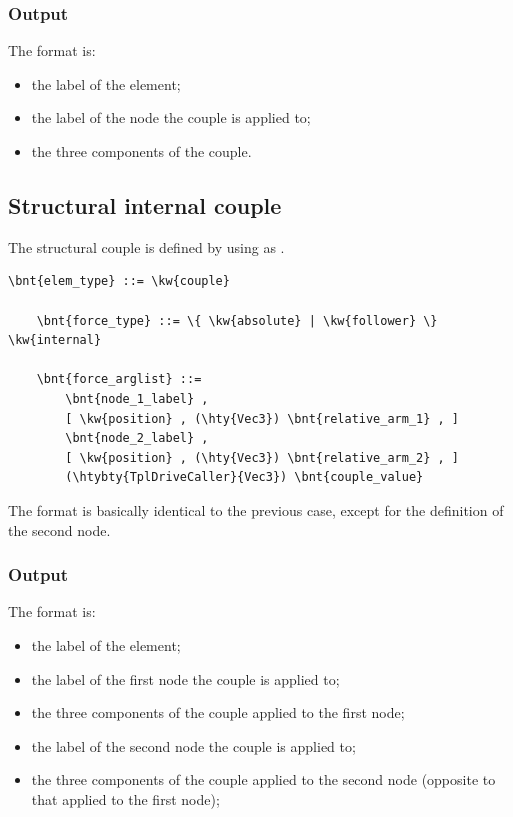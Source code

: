 \subsubsection{Output}
The format is:
\begin{itemize}
    \item the label of the element;
    \item the label of the node the couple is applied to;
    \item the three components of the couple.
\end{itemize}

\subsection{Structural internal couple}
\label{sec:EL:FORCE:STRUCTURAL:INTERNAL_COUPLE}
The structural couple is defined by using  as .
\begin{Verbatim}[commandchars=\\\{\}]
    \bnt{elem_type} ::= \kw{couple}

    \bnt{force_type} ::= \{ \kw{absolute} | \kw{follower} \} \kw{internal}

    \bnt{force_arglist} ::=
        \bnt{node_1_label} ,
        [ \kw{position} , (\hty{Vec3}) \bnt{relative_arm_1} , ]
        \bnt{node_2_label} ,
        [ \kw{position} , (\hty{Vec3}) \bnt{relative_arm_2} , ]
        (\htybty{TplDriveCaller}{Vec3}) \bnt{couple_value}
\end{Verbatim}
The format is basically identical to the previous case,
except for the definition of the second node.

\subsubsection{Output}
The format is:
\begin{itemize}
    \item the label of the element;
    \item the label of the first node the couple is applied to;
    \item the three components of the couple applied to the first node;
    \item the label of the second node the couple is applied to;
    \item the three components of the couple applied to the second node
	  (opposite to that applied to the first node);
\end{itemize}

